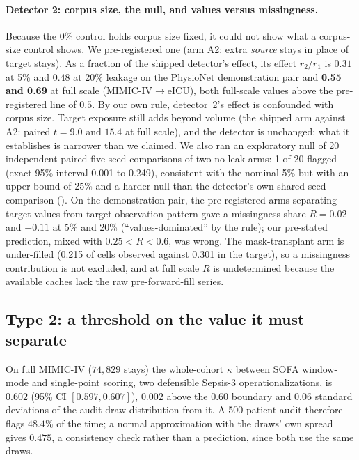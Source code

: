 \documentclass[pmlr,twocolumn,10pt]{jmlr}
\begin{document}
\paragraph{Detector 2: corpus size, the null, and values versus missingness.}
Because the 0\% control holds corpus size fixed, it could not show what a
corpus-size control shows. We pre-registered one (arm A2: extra \emph{source}
stays in place of target stays). As a fraction of the shipped detector's effect,
its effect $r_2/r_1$ is $0.31$ at 5\% and $0.48$ at 20\% leakage on the PhysioNet
demonstration pair and \textbf{0.55 and 0.69} at full scale (MIMIC-IV$\to$eICU),
both full-scale values above the pre-registered line of $0.5$. By our own rule,
detector~2's effect is confounded with corpus size. Target exposure still adds
beyond volume (the shipped arm against A2: paired $t=9.0$ and $15.4$ at full
scale), and the detector is unchanged; what it establishes is narrower than we
claimed. We also ran an exploratory null of 20 independent paired five-seed
comparisons of two no-leak arms: 1 of 20 flagged (exact 95\% interval 0.001 to
0.249), consistent with the nominal 5\% but with an upper bound of 25\% and a
harder null than the detector's own shared-seed comparison
(). On the demonstration pair, the pre-registered arms
separating target values from target observation pattern gave a missingness
share $R=0.02$ and $-0.11$ at 5\% and 20\% (``values-dominated'' by the rule);
our pre-stated prediction, mixed with $0.25<R<0.6$, was wrong. The mask-transplant
arm is under-filled (0.215 of cells observed against 0.301 in the target), so a
missingness contribution is not excluded, and at full scale $R$ is undetermined
because the available caches lack the raw pre-forward-fill series.

\subsection{Type 2: a threshold on the value it must separate}

On full MIMIC-IV ($74{,}829$ stays) the whole-cohort $\kappa$ between SOFA
window-mode and single-point scoring, two defensible Sepsis-3 operationalizations,
is $\mathbf{0.602}$ (95\% CI $[0.597, 0.607]$), $0.002$ above the $0.60$ boundary
and $0.06$ standard deviations of the audit-draw distribution from it. A
500-patient audit therefore flags $48.4\%$ of the time; a normal approximation
with the draws' own spread gives $0.475$, a consistency check rather than a
prediction, since both use the same draws.
\end{document}
